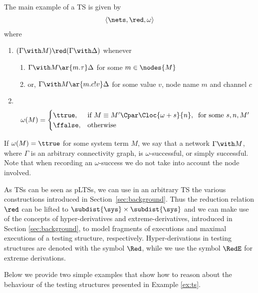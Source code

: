 \documentclass{LMCS}
\begin{document}
\begin{exa}\label{ex:ts}
The main example of a TS is given by
\begin{align*}
  \langle \nets, \red, \omega \rangle
\end{align*}
where 
\begin{enumerate}[label=(\roman*)]
\item $(\Gamma \with M) \red (\Gamma \with \Delta)$ whenever
  \begin{enumerate}[label=(\alph*)]
  \item $\Gamma \with M \ar{m.\tau} \Delta$ for some $m \in \nodes{M}$

  \item or, $\Gamma \with M \ar{m.c!v} \Delta$ for some value $v$, node name $m$ and channel $c$
\end{enumerate}
  
\item ~
\begin{align*}
  \omega(M) = 
  \begin{cases}
    \ttrue, &  \text{if } M \equiv M' \Cpar \Cloc{\omega + s}{n}, \;\;\text{for some } s,n, M'\\
    \ffalse, & \text{otherwise}
  \end{cases}
\end{align*}
\end{enumerate}
If $\omega(M) = \ttrue$ for some system term $M$, we say that a network $\Gamma \with M$, where 
$\Gamma$ is an arbitrary connectivity graph, is $\omega$-successful, or simply successful. 
Note that when recording an $\omega$-success we do not take into account the node involved.
  \end{exa}
\noindent
As TSs can be seen as pLTSs, we can use in an arbitrary TS the various constructions
introduced in Section~\ref{sec:background}. Thus the reduction relation 
 $\red$ can be lifted to 
$\subdist{\sys} \times \subdist{\sys}$ and 
we can make use of the concepts of 
hyper-derivatives and extreme-derivatives, introduced in Section \ref{sec:background}, to 
model fragments of executions and maximal executions of a testing structure, respectively.
Hyper-derivations in testing structures are denoted with the symbol $\Red$, while 
we use the symbol $\RedE$ for extreme derivations.

Below we provide two simple examples that show how to reason about the behaviour of the testing 
structures presented in Example \ref{ex:ts}.
\end{document}
